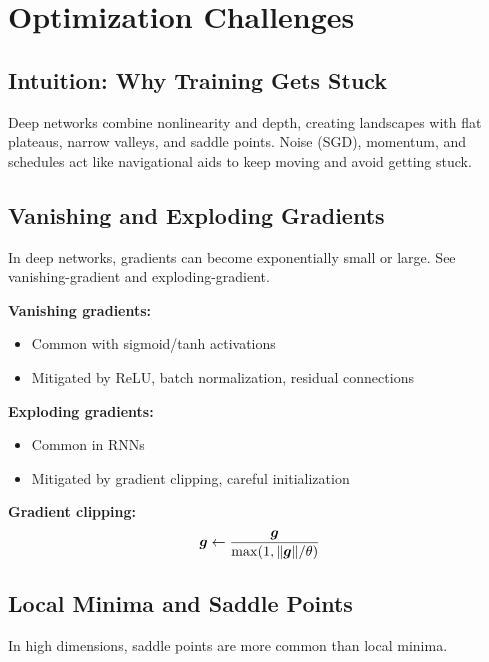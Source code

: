 
\section{Optimization Challenges }
\label{sec:challenges}

\subsection{Intuition: Why Training Gets Stuck}

Deep networks combine nonlinearity and depth, creating landscapes with flat plateaus, narrow valleys, and saddle points. Noise (SGD), momentum, and schedules act like navigational aids to keep moving and avoid getting stuck.

\subsection{Vanishing and Exploding Gradients}

In deep networks, gradients can become exponentially small or large. See \gls{vanishing-gradient} and \gls{exploding-gradient}.

\textbf{Vanishing gradients:}
\begin{itemize}
    \item Common with sigmoid/tanh activations
    \item Mitigated by ReLU, batch normalization, residual connections
\end{itemize}

\textbf{Exploding gradients:}
\begin{itemize}
    \item Common in RNNs
    \item Mitigated by gradient clipping, careful initialization
\end{itemize}

\textbf{Gradient clipping:}
\begin{equation}
\boldsymbol{g} \leftarrow \frac{\boldsymbol{g}}{\max(1, \|\boldsymbol{g}\| / \theta)}
\end{equation}

\subsection{Local Minima and Saddle Points}

In high dimensions, saddle points are more common than local minima.

